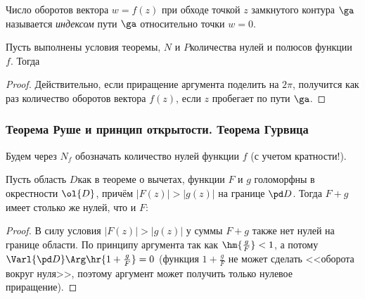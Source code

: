 \documentclass[a4paper]{article}
\begin{document}
\begin{df}
Число оборотов вектора $w = f(z)$ при обходе
точкой $z$ замкнутого контура $\ga$ называется
\emph{индексом} пути $\ga$ относительно точки $w=0$.
\end{df}

\begin{imp}
Пусть выполнены условия теоремы, $N$ и $P$\т количества нулей и полюсов функции $f$. Тогда
\end{imp}
\begin{proof}
Действительно, если приращение аргумента поделить на $2\pi$, получится как раз количество
оборотов вектора $f(z)$, если $z$ пробегает по пути $\ga$.
\end{proof}

\subsubsection{Теорема Руше и принцип открытости. Теорема Гурвица}

Будем через $N_f$ обозначать количество нулей функции $f$ (с учетом кратности!).

\begin{theorem}[Руш\'е]
Пусть область $D$\т как в теореме о вычетах, функции $F$ и $g$ голоморфны в окрестности $\ol{D}$,
причём $|F(z)|>|g(z)|$ на границе $\pd D$. Тогда $F+g$ имеет столько же нулей, что и $F$:
\end{theorem}
\begin{proof}
В силу условия $|F(z)| > |g(z)|$ у суммы $F+g$ также нет нулей на границе области.
По принципу аргумента
так как $\hm{\frac{g}{F}} < 1$, а потому $\Varl{\pd D} \Arg \hr{1+\frac{g}{F}}=0$ (функция $1 + \frac{g}{F}$ не может
сделать <<оборота вокруг нуля>>, поэтому аргумент может получить только нулевое приращение).
\end{proof}
\end{document}
